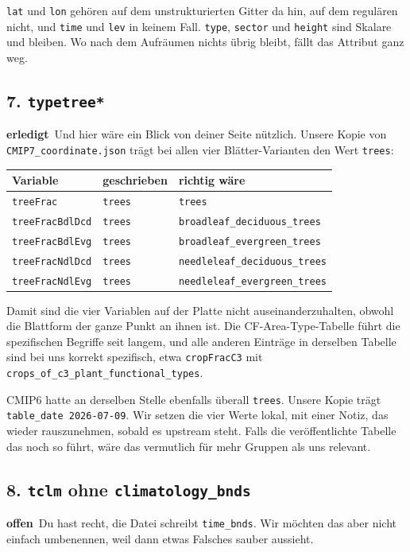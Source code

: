 \documentclass[11pt,a4paper]{article}
\newcommand{\code}[1]{\texttt{\small #1}}
\newcommand{\ok}{\textcolor{green!45!black}{\textbf{erledigt}}}
\newcommand{\offen}{\textcolor{orange!75!black}{\textbf{offen}}}
\begin{document}
\code{lat} und \code{lon} geh\"oren auf dem unstrukturierten Gitter da hin, auf
dem regul\"aren nicht, und \code{time} und \code{lev} in keinem Fall.
\code{type}, \code{sector} und \code{height} sind Skalare und bleiben. Wo nach
dem Aufr\"aumen nichts \"ubrig bleibt, f\"allt das Attribut ganz weg.

\subsection*{7. \code{typetree*}}
\ok\ Und hier w\"are ein Blick von deiner Seite n\"utzlich. Unsere Kopie von
\code{CMIP7\_coordinate.json} tr\"agt bei allen vier Bl\"atter-Varianten den Wert
\code{trees}:

\begin{center}
\begin{tabular}{lll}
\toprule
\textbf{Variable} & \textbf{geschrieben} & \textbf{richtig w\"are} \\
\midrule
\code{treeFrac}       & \code{trees} & \code{trees} \\
\code{treeFracBdlDcd} & \code{trees} & \code{broadleaf\_deciduous\_trees} \\
\code{treeFracBdlEvg} & \code{trees} & \code{broadleaf\_evergreen\_trees} \\
\code{treeFracNdlDcd} & \code{trees} & \code{needleleaf\_deciduous\_trees} \\
\code{treeFracNdlEvg} & \code{trees} & \code{needleleaf\_evergreen\_trees} \\
\bottomrule
\end{tabular}
\end{center}

Damit sind die vier Variablen auf der Platte nicht auseinanderzuhalten, obwohl
die Blattform der ganze Punkt an ihnen ist. Die CF-Area-Type-Tabelle f\"uhrt die
spezifischen Begriffe seit langem, und alle anderen Eintr\"age in derselben
Tabelle sind bei uns korrekt spezifisch, etwa \code{cropFracC3} mit
\code{crops\_of\_c3\_plant\_functional\_types}.

CMIP6 hatte an derselben Stelle ebenfalls \"uberall \code{trees}. Unsere Kopie
tr\"agt \code{table\_date 2026-07-09}. Wir setzen die vier Werte lokal, mit
einer Notiz, das wieder rauszunehmen, sobald es upstream steht. Falls die
ver\"offentlichte Tabelle das noch so f\"uhrt, w\"are das vermutlich f\"ur mehr
Gruppen als uns relevant.

\subsection*{8. \code{tclm} ohne \code{climatology\_bnds}}
\offen\ Du hast recht, die Datei schreibt \code{time\_bnds}. Wir m\"ochten das
aber nicht einfach umbenennen, weil dann etwas Falsches sauber aussieht.
\end{document}
